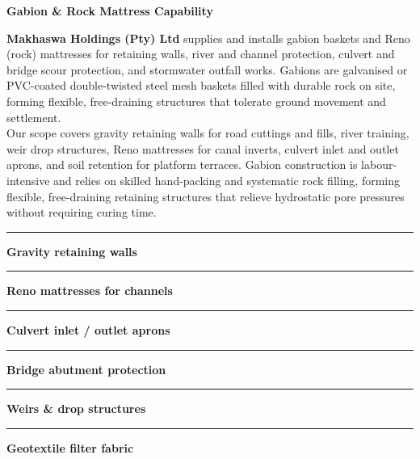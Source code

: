 \documentclass[a4paper,11pt]{article}
\begin{document}
\noindent
\begin{minipage}[t]{0.62\textwidth}
    \vspace{0pt}
    {\large\bfseries\color{mhnavy} Gabion \& Rock Mattress Capability}
    \vspace{0.10cm}

    {\fontsize{8.6pt}{12.0pt}\selectfont\color{mhtext}
    \textbf{Makhaswa Holdings (Pty) Ltd} supplies and installs gabion baskets and Reno (rock) mattresses for retaining walls, river and channel protection, culvert and bridge scour protection, and stormwater outfall works. Gabions are galvanised or PVC-coated double-twisted steel mesh baskets filled with durable rock on site, forming flexible, free-draining structures that tolerate ground movement and settlement.\\[3pt]
    Our scope covers gravity retaining walls for road cuttings and fills, river training, weir drop structures, Reno mattresses for canal inverts, culvert inlet and outlet aprons, and soil retention for platform terraces. Gabion construction is labour-intensive and relies on skilled hand-packing and systematic rock filling, forming flexible, free-draining retaining structures that relieve hydrostatic pore pressures without requiring curing time.
    }
\end{minipage}
\hfill
\begin{minipage}[t]{0.34\textwidth}
    \vspace{0pt}
    \begin{tcolorbox}[
        enhanced, colback=mhoffwhite, colframe=mhnavy, boxrule=0.8pt, arc=4pt,
        title={\bfseries\color{white}\faLayerGroup\ Gabion Scope of Work},
        colbacktitle=mhnavy, left=7pt, right=7pt, top=5pt, bottom=5pt,
        drop shadow=black!4
    ]
        \fontsize{7.8pt}{11.0pt}\selectfont
        \textcolor{mhnavy}{\rule{3.5pt}{3.5pt}}\hspace{4pt}\textbf{Gravity retaining walls}\\
        \textcolor{mhnavy}{\rule{3.5pt}{3.5pt}}\hspace{4pt}\textbf{Reno mattresses for channels}\\
        \textcolor{mhnavy}{\rule{3.5pt}{3.5pt}}\hspace{4pt}\textbf{Culvert inlet / outlet aprons}\\
        \textcolor{mhnavy}{\rule{3.5pt}{3.5pt}}\hspace{4pt}\textbf{Bridge abutment protection}\\
        \textcolor{mhnavy}{\rule{3.5pt}{3.5pt}}\hspace{4pt}\textbf{Weirs \& drop structures}\\
        \textcolor{mhnavy}{\rule{3.5pt}{3.5pt}}\hspace{4pt}\textbf{Geotextile filter fabric}
    \end{tcolorbox}
\end{minipage}
\end{document}
